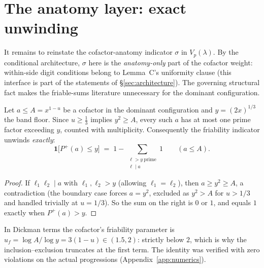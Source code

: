 \section{The anatomy layer: exact unwinding}\label{sec:anatomy}

It remains to reinstate the cofactor-anatomy indicator $\sigma$ in
$V_p(\lambda)$. By the conditional architecture, $\sigma$ here is the
\emph{anatomy-only} part of the cofactor weight: within-side digit
conditions belong to Lemma~C's uniformity clause (this interface is part
of the statements of \S\ref{sec:architecture}). The governing structural
fact makes the friable-sums literature unnecessary for the dominant
configuration.

\begin{proposition}\label{prop:one-large}
\statusPM\quad
Let $a\le A=x^{1-u}$ be a cofactor in the dominant configuration and
$y=(2x)^{1/3}$ the band floor. Since $u\ge\tfrac13$ implies $y^2\ge A$,
every such $a$ has at most one prime factor exceeding $y$, counted with
multiplicity. Consequently the friability indicator unwinds
\emph{exactly}:
\[
\mathbf 1\big[P^{+}(a)\le y\big]
\;=\;1-\sum_{\substack{\ell>y\ \mathrm{prime}\\ \ell\mid a}}1
\qquad(a\le A).
\]
\end{proposition}

\begin{proof}
If $\ell_1\ell_2\mid a$ with $\ell_1,\ell_2>y$ (allowing
$\ell_1=\ell_2$), then $a\ge y^2\ge A$, a contradiction (the boundary
case forces $a=y^2$, excluded as $y^2>A$ for $u>1/3$ and handled
trivially at $u=1/3$). So the sum on the right is $0$ or $1$, and equals
$1$ exactly when $P^{+}(a)>y$.
\end{proof}

\begin{remark}
In Dickman terms the cofactor's friability parameter is
$u_f=\log A/\log y=3(1-u)\in(1.5,2)$: strictly below $2$, which is why
the inclusion--exclusion truncates at the first term. The identity was
verified with zero violations on the actual progressions
(Appendix~\ref{app:numerics}).
\end{remark}

